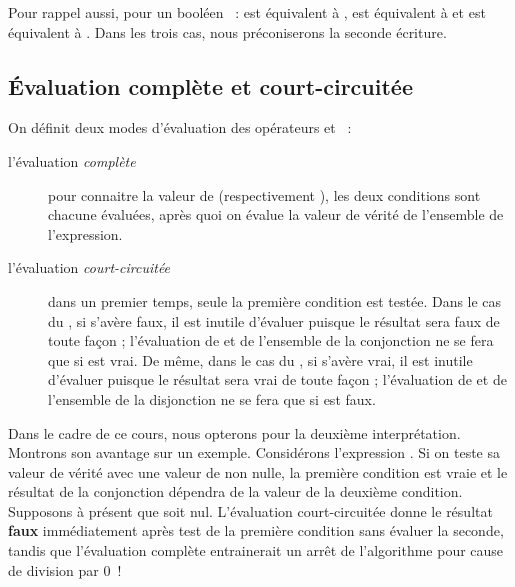			Pour rappel aussi, pour un booléen ~: 
			 est équivalent à ,
			 est équivalent à  et 
			 est équivalent à .
			Dans les trois cas, nous préconiserons la seconde écriture.
	
		\subsection{Évaluation complète et court-circuitée}
	
			On définit deux modes d’évaluation des opérateurs 
			et ~:
	
			\begin{description}
			\item[l’évaluation \textit{complète}]
				pour connaitre la valeur de
				 (respectivement
				), les deux conditions sont chacune
				évaluées, après quoi on évalue la valeur de vérité de l’ensemble de
				l’expression.
			\item[l’évaluation \textit{court-circuitée}]
				dans un premier temps, seule la
				première condition est testée. Dans le cas du ,
				si  s’avère faux, il est inutile d’évaluer
				 puisque le résultat sera faux de toute façon
				; l’évaluation de  et de l’ensemble de la
				conjonction ne se fera que si  est vrai. De
				même, dans le cas du , si
				 s’avère vrai, il est inutile d’évaluer
				 puisque le résultat sera vrai de toute façon
				; l’évaluation de  et de l’ensemble de la
				disjonction ne se fera que si  est faux.
			\end{description}
	
			Dans le cadre de ce cours, nous opterons pour la deuxième 
			interprétation.
			Montrons son avantage sur un exemple.
			Considérons	l’expression 
			\pseudocode{${\neq}$}. Si on teste sa valeur de vérité avec une
			valeur de  non nulle, la première condition est
			vraie et le résultat de la conjonction dépendra de la valeur de la
			deuxième condition. Supposons à présent que  soit
			nul. L’évaluation court-circuitée donne le résultat \textbf{faux}
			immédiatement après test de la première condition sans évaluer la
			seconde, tandis que l’évaluation complète entrainerait un arrêt de
			l’algorithme pour cause de division par 0~!
	
